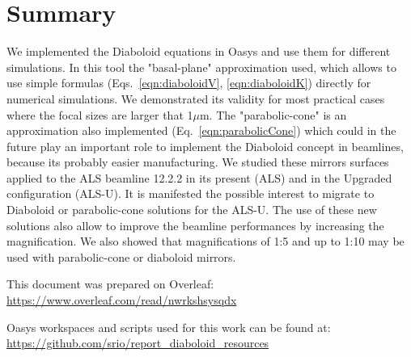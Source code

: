 \documentclass[a4paper, 11pt]{article}
\begin{document}
\section{Summary}

We implemented the Diaboloid equations in Oasys and use them for different simulations. In this tool the "basal-plane" approximation used, which allows to use simple formulas (Eqs.~\ref{eqn:diaboloidV}, \ref{eqn:diaboloidK}) directly for numerical simulations. We demonstrated its validity for most practical cases where the focal sizes are larger that 1$\mu$m. The "parabolic-cone" is an approximation also implemented (Eq.~\ref{eqn:parabolicCone}) which could in the future play an important role to implement the Diaboloid concept in beamlines, because its probably easier manufacturing. We studied these mirrors surfaces applied to the ALS beamline 12.2.2 in its present (ALS) and in the Upgraded configuration (ALS-U). It is manifested the possible interest to migrate to Diaboloid or parabolic-cone solutions for the ALS-U. The use of these new solutions also allow to improve the beamline performances by increasing the magnification. We also showed that magnifications of 1:5 and up to 1:10 may be used with parabolic-cone or diaboloid mirrors. 




\vspace{10pt}
\vspace{4pt}
This document was prepared on Overleaf: %
\url{https://www.overleaf.com/read/nwrkshsysqdx}

Oasys workspaces and scripts used for this work can be found at: %
\url{https://github.com/srio/report\_diaboloid\_resources}
\end{document}
